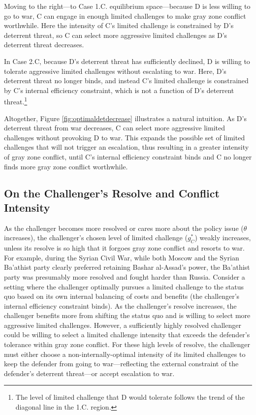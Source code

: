 \documentclass[bibtex, autowc]{apsr_submission}
\begin{document}
Moving to the right---to Case 1.C. equilibrium space---because D is less willing to go to war, C can engage in enough limited challenges to make gray zone conflict worthwhile. Here the intensity of C's limited challenge is constrained by D's deterrent threat, so C can select more aggressive limited challenges as D's deterrent threat decreases.

In  Case 2.C, because D's deterrent threat has sufficiently declined, D is willing to tolerate aggressive limited challenges without escalating to war. Here, D's deterrent threat no longer binds, and instead C's limited challenge is constrained by C's internal efficiency constraint, which is not a function of D's deterrent threat.\footnote{The level of limited challenge that D would tolerate follows the trend of the diagonal line in the 1.C. region.}

Altogether, Figure \ref{fig:optimaldetdecrease} illustrates a natural intuition. As D's deterrent threat from war decreases, C can select more aggressive limited challenges without provoking D to war. This expands the possible set of limited challenges that will not trigger an escalation, thus resulting in a greater intensity of gray zone conflict, until C's internal efficiency constraint binds and C no longer finds more gray zone conflict worthwhile.

\subsection{On the Challenger's Resolve and Conflict Intensity}
As the challenger becomes more resolved or cares more about the policy issue ($\theta$ increases), the challenger's chosen level of limited challenge ($g_{C}^{*}$) weakly increases, unless its resolve is so high that it forgoes gray zone conflict and resorts to war. For example, during the Syrian Civil War, while both Moscow and the Syrian Ba'athist party clearly preferred retaining Bashar al-Assad's power, the Ba'athist party was presumably more resolved and fought harder than Russia.
Consider a setting where 
the challenger optimally pursues a limited challenge to the status quo based on its own internal balancing of costs and benefits (the challenger's internal efficiency constraint binds). As the challenger's resolve increases, the challenger benefits more from shifting the status quo and is willing to select more aggressive limited challenges. However, a sufficiently highly resolved challenger could be willing to select a limited challenge intensity that exceeds the defender's tolerance within gray zone conflict. For these high levels of resolve, the challenger must either choose a non-internally-optimal intensity of its limited challenges to keep the defender from going to war---reflecting the external constraint of the defender's deterrent threat---or accept escalation to war.
\end{document}
